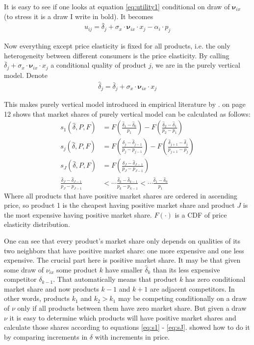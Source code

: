 \documentclass[12pt,letterpaper]{article}
\begin{document}
	It is easy to see if one looks at equation \ref{eq:utility1} conditional on draw of $\boldsymbol\nu_{ix}$ (to stress it is a draw I write in bold). It becomes
	\begin{align}
	u_{ij} = {\bar \delta_j} + \sigma_x \cdot \boldsymbol{\nu}_{ix} \cdot x_j - \alpha_i\cdot p_j
	\label{eq:utility}
	\end{align}
	
	Now everything except price elasticity is fixed for all products, i.e. the only heterogeneity between different consumers is the price elasticity.  By  calling ${\bar \delta_j} + \sigma_x \cdot \boldsymbol{\nu}_{ix} \cdot x_j$ a conditional quality of product $j$, we are in the purely vertical model. Denote 
	\begin{align}
	\hat \delta_j = {\bar \delta_j} + \sigma_x \cdot \boldsymbol{\nu}_{ix} \cdot x_j
	\label{eq:delta}
	\end{align}
	
	This makes purely vertical model introduced in empirical literature by \cite{bresnahan1990entry}. \cite{song2007measuring} on page 12 shows that market shares of purely vertical model can be calculated as follows:
	\begin{align}
	s_1(\hat \delta, P,F) &= F\left(\frac{\hat\delta_1 - \hat\delta_0}{p_1}\right) - F\left(\frac{\hat\delta_2 - \hat\delta_1}{p_2 - p_1}\right)\label{eq:s1}\\	
	s_j(\hat \delta, P,F) &= F\left(\frac{\hat\delta_j - \hat\delta_{j-1}}{p_j - p_{j-1}}\right) - F\left(\frac{\hat\delta_{j+1} - \hat\delta_{j}}{p_{j+1} - p_{j}}\right)\label{eq:sk}\\	
	s_J(\hat \delta, P,F) &= F\left(\frac{\hat\delta_J - \hat\delta_{J-1}}{p_J - p_{J-1}}\right)\label{eq:sJ}\\
	\frac{\hat\delta_J - \hat\delta_{J-1}}{p_J - p_{J-1}} &<\cdots \frac{\hat\delta_k - \hat\delta_{k-1}}{p_k - p_{k-1}}<\cdots\frac{\hat\delta_1 - \hat\delta_{0}}{p_1}
	\end{align}
	Where all products that have positive market shares are ordered in ascending price, so product 1 is the cheapest having positive market share and product $J$ is the most expensive having positive market share. $F(\cdot)$ is a CDF of price elasticity distribution.  
	
	One can see that every product's market share only depends on qualities of its two neighbors that have positive market share: one more expensive and one less expensive. The crucial part here is positive market share. It may be that given some draw of $\nu_{ix}$ some product $k$ have smaller $\hat \delta_k$ than its less expensive competitor $\delta_{k-1}$. That automatically means that product $k$ has zero conditional market share and now products $k-1$ and $k+1$ are adjacent competitors. In other words, products $k_1$ and $k_2>k_1$ may be competing conditionally on a draw of $\nu$ only if all products between them have zero market share. But given a draw $\nu$ it is easy to determine which products will have positive market shares and calculate those shares according to equations \ref{eq:s1} - \ref{eq:sJ}. \cite{berry2007pure} showed how to do it by comparing increments in $\delta$ with increments in price.
	
\end{document}
